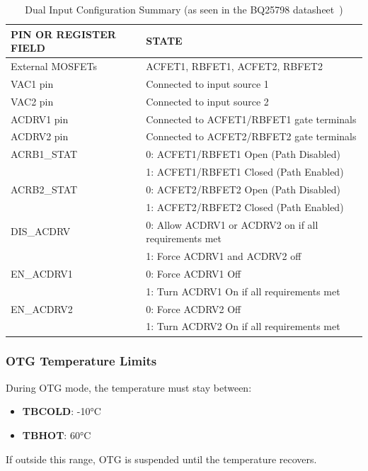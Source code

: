 \documentclass[12pt]{article}
\begin{document}
\begin{table}[H]
    \centering
    \begin{tabular}{|p{6cm}|p{8cm}|}
        \hline
        \rowcolor{headerbg}
        \textcolor{headerfg}{\textbf{PIN OR REGISTER FIELD}} &
        \textcolor{headerfg}{\textbf{STATE}} \\
        \hline
        External MOSFETs & ACFET1, RBFET1, ACFET2, RBFET2 \\
        VAC1 pin & Connected to input source 1 \\
        VAC2 pin & Connected to input source 2 \\
        ACDRV1 pin & Connected to ACFET1/RBFET1 gate terminals \\
        ACDRV2 pin & Connected to ACFET2/RBFET2 gate terminals \\
        ACRB1\_STAT & 0: ACFET1/RBFET1 Open (Path Disabled)\\
                     & 1: ACFET1/RBFET1 Closed (Path Enabled) \\
        ACRB2\_STAT & 0: ACFET2/RBFET2 Open (Path Disabled)\\
                     & 1: ACFET2/RBFET2 Closed (Path Enabled) \\
        DIS\_ACDRV & 0: Allow ACDRV1 or ACDRV2 on if all requirements met\\
                   & 1: Force ACDRV1 and ACDRV2 off\\
        EN\_ACDRV1 & 0: Force ACDRV1 Off\\
                   & 1: Turn ACDRV1 On if all requirements met \\
        EN\_ACDRV2 & 0: Force ACDRV2 Off\\
                   & 1: Turn ACDRV2 On if all requirements met \\
        \hline
    \end{tabular}
    \caption{Dual Input Configuration Summary (as seen in the BQ25798 datasheet~\cite[p.~46]{TI_BQ25798})}
    \label{tab:dual_input_config_summary}
\end{table}

\subsubsection*{OTG Temperature Limits}
During OTG mode, the temperature must stay between:
\begin{itemize}
    \item \textbf{TBCOLD}: -10°C
    \item \textbf{TBHOT}: 60°C
\end{itemize}
If outside this range, OTG is suspended until the temperature recovers.
\end{document}
